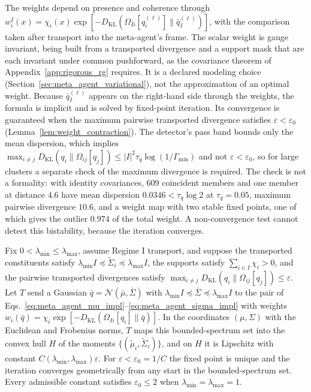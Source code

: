 The weights depend on presence and coherence through $w_i^I(x) = \chi_i(x) \exp[-D_{\mathrm{KL}}(\Omega_{Ii}[q_i^{(\ell)}] \| \bar{q}_I^{(\ell)})]$, with the comparison taken after transport into the meta-agent's frame. The scalar weight is gauge invariant, being built from a transported divergence and a support mask that are each invariant under common pushforward, as the covariance theorem of Appendix~\ref{app:rigorous_rg} requires. It is a declared modeling choice (Section~\ref{sec:meta_agent_variational}), not the approximation of an optimal weight. Because $\bar{q}_I^{(\ell)}$ appears on the right-hand side through the weights, the formula is implicit and is solved by fixed-point iteration. Its convergence is guaranteed when the maximum pairwise transported divergence satisfies $\varepsilon < \varepsilon_0$ (Lemma~\ref{lem:weight_contraction}). The detector's pass band bounds only the mean dispersion, which implies $\max_{i \ne j} D_{\mathrm{KL}}(q_i \| \Omega_{ij}[q_j]) \le |I|^2\tau_q\log(1/\Gamma_{\min})$ and not $\varepsilon < \varepsilon_0$, so for large clusters a separate check of the maximum divergence is required. The check is not a formality: with identity covariances, 609 coincident members and one member at distance $4.6$ have mean dispersion $0.0346 < \tau_q\log 2$ at $\tau_q = 0.05$, maximum pairwise divergence $10.6$, and a weight map with two stable fixed points, one of which gives the outlier $0.974$ of the total weight. A non-convergence test cannot detect this bistability, because the iteration converges.

\begin{lemma}
\label{lem:weight_contraction}
Fix $0 < \lambda_{\min} \le \lambda_{\max}$, assume Regime I transport, and suppose the transported constituents satisfy $\lambda_{\min} I \preceq \tilde{\Sigma}_i \preceq \lambda_{\max} I$, the supports satisfy $\sum_{i \in I}\chi_i > 0$, and the pairwise transported divergences satisfy $\max_{i \ne j} D_{\mathrm{KL}}(q_i \| \Omega_{ij}[q_j]) \le \varepsilon$. Let $T$ send a Gaussian $\bar{q} = \mathcal{N}(\bar{\mu}, \bar{\Sigma})$ with $\lambda_{\min} I \preceq \bar{\Sigma} \preceq \lambda_{\max} I$ to the pair of Eqs.~\eqref{eq:meta_agent_mu_impl}--\eqref{eq:meta_agent_sigma_impl} with weights $w_i(\bar{q}) = \chi_i \exp[-D_{\mathrm{KL}}(\Omega_{Ii}[q_i] \| \bar{q})]$. In the coordinates $(\mu, \Sigma)$ with the Euclidean and Frobenius norms, $T$ maps this bounded-spectrum set into the convex hull $H$ of the moments $\{(\tilde{\mu}_i, \tilde{\Sigma}_i)\}$, and on $H$ it is Lipschitz with constant $C(\lambda_{\min}, \lambda_{\max})\varepsilon$. For $\varepsilon < \varepsilon_0 = 1/C$ the fixed point is unique and the iteration converges geometrically from any start in the bounded-spectrum set. Every admissible constant satisfies $\varepsilon_0 \le 2$ when $\lambda_{\min} = \lambda_{\max} = 1$.
\end{lemma}

